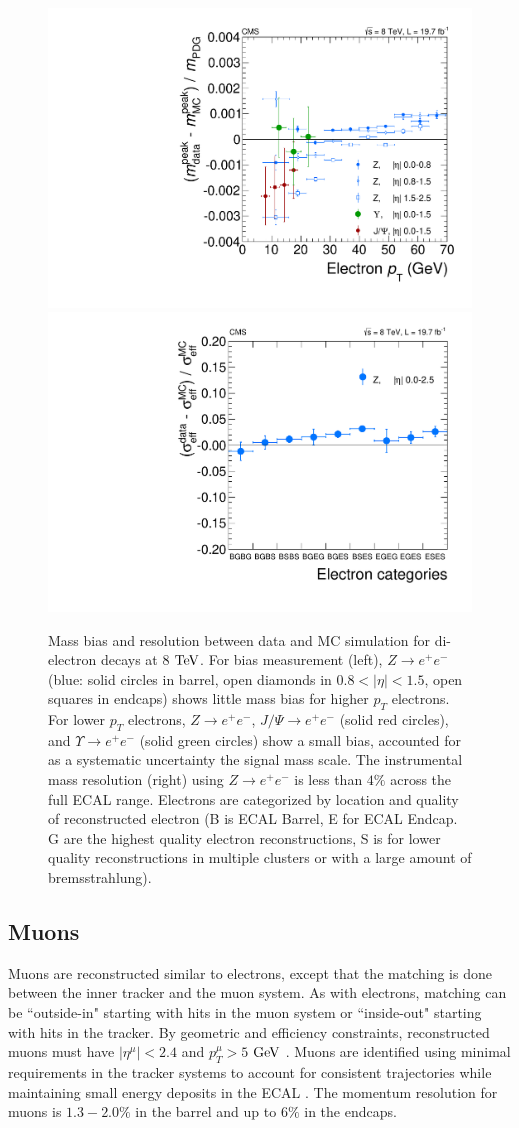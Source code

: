 \begin{figure}[htbp]
\begin{center}
\includegraphics[width=.45\linewidth]{HiggsDiscovery/figures/scale-ptdep-8TeV.pdf}
\includegraphics[width=.45\linewidth]{HiggsDiscovery/figures/electron_resolution.pdf}
\caption[Mass Resolution and Bias from Di-electron Decays]{Mass bias and resolution between data and MC simulation for di-electron decays at $8$ $\rm{TeV}$. For bias measurement (left), $Z\rightarrow e^+e^-$ (blue: solid circles in barrel, open diamonds in $0.8<|\eta|<1.5$, open squares in endcaps) shows little mass bias for higher $p_T$ electrons. For lower $p_T$ electrons, $Z\rightarrow e^+e^-$, $J/\Psi\rightarrow e^+e^-$ (solid red circles), and $\Upsilon\rightarrow e^+e^-$ (solid green circles) show a small bias, accounted for as a systematic uncertainty the signal mass scale. The instrumental mass resolution (right) using $Z\rightarrow e^+e^-$ is less than $4\%$ across the full ECAL range. Electrons are categorized by location and quality of reconstructed electron (B is ECAL Barrel, E for ECAL Endcap. G are the highest quality electron reconstructions, S is for lower quality reconstructions in multiple clusters or with a large amount of bremsstrahlung).}
\label{fig:ElectronMassResolutionAndBias}
\end{center}
\end{figure}

\subsection{Muons}
\label{sec:zz4lMuons}

Muons are reconstructed similar to electrons, except that the matching is done between the inner tracker and the muon system. As with electrons, matching can be ``outside-in" starting with hits in the muon system or ``inside-out" starting with hits in the tracker. By geometric and efficiency constraints, reconstructed muons must have $|\eta^\mu|<2.4$ and $p_T^\mu>5$ $\rm{GeV}$ \cite{MuonTR:2010}. Muons are identified using minimal requirements in the tracker systems to account for consistent trajectories while maintaining small energy deposits in the ECAL \cite{CMS-PAS-PFT-10-003}. The momentum resolution for muons is $1.3-2.0\%$ in the barrel and up to $6\%$ in the endcaps.

